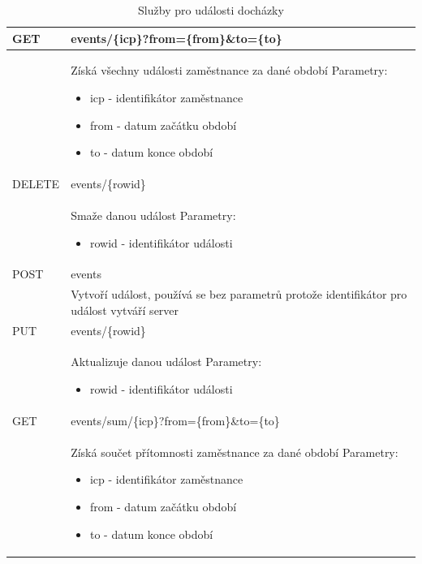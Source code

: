 \documentclass{bakalarka}
\begin{document}
\renewcommand{\arraystretch}{1.5}
\begin{table}[H]
\begin{center}
\begin{tabular}{| m{2cm} |  m{10cm} |}
\hline
\rowcolor{Gray}
GET & events/\{icp\}?from=\{from\}\&to=\{to\} \\ \hline
&  \parbox{10cm}{Získá všechny události zaměstnance za dané období\\
Parametry:\begin{itemize}[noitemsep,nolistsep]
\item icp - identifikátor zaměstnance
\item from - datum začátku období
\item to - datum konce období
\end{itemize}} \\ \hline
{}
DELETE  & events/\{rowid\} \\  \hline
&  \parbox{10cm}{Smaže danou událost\\
Parametry:\begin{itemize}[noitemsep,nolistsep]
\item rowid - identifikátor události
\end{itemize}} \\ \hline
{}
POST  & events \\  \hline
&  \parbox{10cm}{Vytvoří událost, používá se bez parametrů protože identifikátor pro událost vytváří server
} \\ \hline
{}
PUT  & events/\{rowid\} \\ 
&  \parbox{10cm}{Aktualizuje danou událost\\
Parametry:\begin{itemize}[noitemsep,nolistsep]
\item rowid - identifikátor události
\end{itemize}} \\ \hline
{}
GET & events/sum/\{icp\}?from=\{from\}\&to=\{to\} \\ \hline
&  \parbox{10cm}{Získá součet přítomnosti zaměstnance za dané období\\
Parametry:\begin{itemize}[noitemsep,nolistsep]
\item icp - identifikátor zaměstnance
\item from - datum začátku období
\item to - datum konce období
\end{itemize}} \\ \hline
\end{tabular}
\end{center}
\caption{Služby pro události docházky}
\label{tab:urievents}
\end {table}
\end{document}

